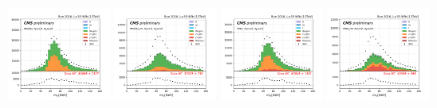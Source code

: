 \begin{figure}
    \centering
    \includegraphics[width=0.24\textwidth]{chapters/Appendix/sectionQCD/figures/mutau_==0_==0_dilepton_mass.png}
    \includegraphics[width=0.24\textwidth]{chapters/Appendix/sectionQCD/figures/mutau_ss_==0_==0_dilepton_mass.png}
    \includegraphics[width=0.24\textwidth]{chapters/Appendix/sectionQCD/figures/etau_==0_==0_dilepton_mass.png}
    \includegraphics[width=0.24\textwidth]{chapters/Appendix/sectionQCD/figures/etau_ss_==0_==0_dilepton_mass.png}
    

\end{figure}
